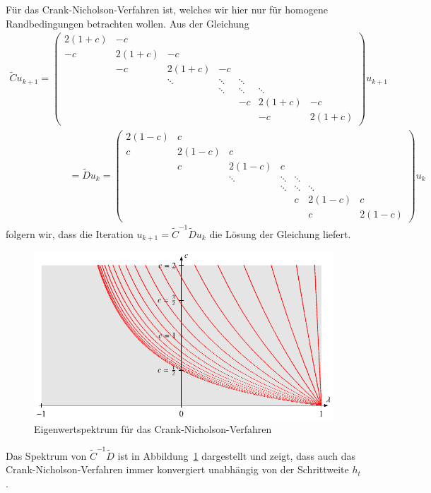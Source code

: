 Für das Crank-Nicholson-Verfahren ist, welches wir hier nur für homogene
Randbedingungen betrachten wollen.
Aus der Gleichung
\begin{gather*}
\tilde{C}u_{k+1}
=
\begin{pmatrix}
2(1+c)&  -c  &      &      &      &      &      \\
   -c &2(1+c)&  -c  &      &      &      &      \\
      &   -c &2(1+c)&  -c  &      &      &      \\
      &      &\ddots&\ddots&\ddots&      &      \\
      &      &      &\ddots&\ddots&\ddots&      \\
      &      &      &      &   -c &2(1+c)&  -c  \\
      &      &      &      &      &  -c  &2(1+c)
\end{pmatrix}
u_{k+1}
\qquad
\qquad
\qquad
\\
\qquad
\qquad
\qquad
=
\tilde{D}u_{k}
=
\begin{pmatrix}
2(1-c)&   c  &      &      &      &      &      \\
    c &2(1-c)&   c  &      &      &      &      \\
      &    c &2(1-c)&   c  &      &      &      \\
      &      &\ddots&\ddots&\ddots&      &      \\
      &      &      &\ddots&\ddots&\ddots&      \\
      &      &      &      &    c &2(1-c)&   c  \\
      &      &      &      &      &   c  &2(1-c)
\end{pmatrix}
u_k
\end{gather*}
folgern wir, dass die Iteration $u_{k+1} = \tilde{C}^{-1}\tilde{D} u_k$
die Lösung der Gleichung liefert.
\begin{figure}
\centering
\includegraphics{chapters/70-pde/images/cnspektrum.pdf}
\caption{Eigenwertspektrum für das Crank-Nicholson-Verfahren
\label{buch:pde:waerme:cnspektrum}}
\end{figure}
Das Spektrum von $\tilde{C}^{-1}\tilde{D}$ ist in
Abbildung~\ref{buch:pde:waerme:cnspektrum} dargestellt und zeigt,
dass auch das Crank-Nicholson-Verfahren immer konvergiert unabhängig von
der Schrittweite $h_t$.

